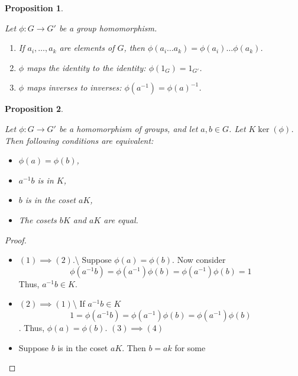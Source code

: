 \documentclass[
]{book}
\providecommand{\tightlist}{%
  \setlength{\itemsep}{0pt}\setlength{\parskip}{0pt}}
\newtheorem{proposition}{Proposition}[chapter]
\theoremstyle{definition}
\theoremstyle{definition}
\theoremstyle{definition}
\theoremstyle{definition}
\theoremstyle{remark}
\begin{document}
\begin{proposition}
\protect\hypertarget{prp:unnamed-chunk-14}{}\label{prp:unnamed-chunk-14}

Let \(\phi: G \rightarrow G'\) be a group homomorphism.

\begin{enumerate}
\def\labelenumi{(\alph{enumi})}
\item
  If \(a_i, \ldots, a_k\) are elements of \(G\), then \(\phi(a_i \ldots a_k) = \phi(a_i) \ldots \phi(a_k)\).
\item
  \(\phi\) maps the identity to the identity: \(\phi(1_G) = 1_{G'}\).
\item
  \(\phi\) maps inverses to inverses: \(\phi(a^{-1}) = \phi(a)^{-1}\).
\end{enumerate}

\end{proposition}

\begin{proposition}
\protect\hypertarget{prp:258}{}\label{prp:258}

Let \(\phi : G \rightarrow G'\) be a homomorphism of groups, and
let \(a,b\in G\). Let \(K\ker(\phi)\).
Then following conditions are equivalent:

\begin{itemize}
\tightlist
\item
  \(\phi(a) = \phi(b)\),\\
\item
  \(a^{-1}b\) is in \(K\),
\item
  \(b\) is in the coset \(aK\),
\item
  The cosets \(bK\) and \(aK\) are equal.
\end{itemize}

\end{proposition}

\begin{proof}
\leavevmode

\begin{itemize}
\tightlist
\item
  \((1)\implies (2)\).\textbackslash{}
  Suppose \(\phi(a) = \phi(b)\). Now consider
  \[\phi(a^{-1}b)=\phi(a^{-1})\phi(b)=\phi(a^{-1} )\phi(b)=1\]
  Thus, \(a^{-1}b\in K\).
\item
  \((2)\implies (1)\)\textbackslash{} If \(a^{-1}b \in K\)
  \[1=\phi(a^{-1}b)=\phi(a^{-1})\phi(b)=\phi(a^{-1} )\phi(b)\].
  Thus, \(\phi(a)=\phi(b)\).
  \((3) \implies (4)\)
\item
  Suppose \(b\) is in the coset \(aK\). Then \(b=ak\) for some
\end{itemize}

\end{proof}
\end{document}
